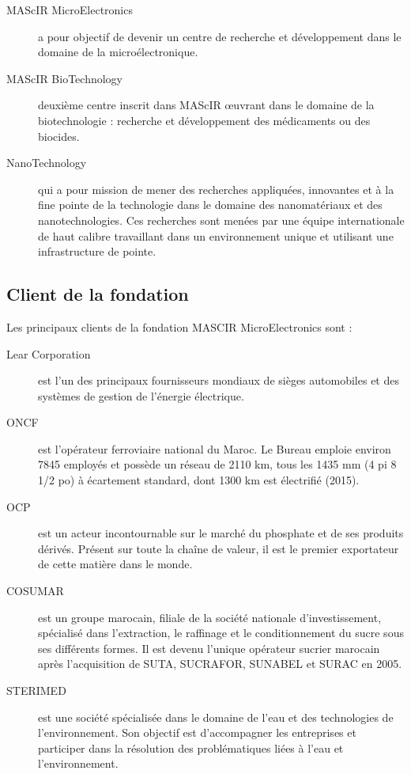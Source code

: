 \documentclass[11pt, a4paper, twoside]{book}
\begin{document}
\begin{description}
\item[MAScIR MicroElectronics] a pour objectif de devenir un centre de recherche et développement dans le domaine de la microélectronique.
\item[MAScIR BioTechnology] deuxième centre inscrit dans MAScIR œuvrant dans le domaine de la biotechnologie : recherche et développement des médicaments ou des biocides.
\item[NanoTechnology] qui a pour mission de mener des recherches appliquées, innovantes et à la fine pointe de la technologie dans le domaine des nanomatériaux et des nanotechnologies. Ces recherches sont menées par une équipe internationale de haut calibre travaillant dans un environnement unique et utilisant une infrastructure de pointe.
\end{description}

\subsection{Client de la fondation}
Les principaux clients de la fondation MASCIR MicroElectronics sont :
\begin{description}
\item[Lear Corporation] est l’un des principaux fournisseurs mondiaux de sièges automobiles et des systèmes de gestion de l’énergie électrique.
\item[ONCF] est l'opérateur ferroviaire national du Maroc. Le Bureau emploie environ 7845 employés et possède un réseau de 2110 km, tous les 1435 mm (4 pi 8 1/2 po) à écartement standard, dont 1300 km est électrifié (2015).
\item[OCP] est un acteur incontournable sur le marché du phosphate et de ses produits dérivés. Présent sur toute la chaîne de valeur, il est le premier exportateur de cette matière dans le monde.
\item[COSUMAR] est un groupe marocain, filiale de la société nationale d'investissement, spécialisé dans l'extraction, le raffinage et le conditionnement du sucre sous ses différents formes. Il est devenu l'unique opérateur sucrier marocain après l'acquisition de SUTA, SUCRAFOR, SUNABEL et SURAC en 2005.
\item[STERIMED] est une société spécialisée dans le domaine de l’eau et des technologies de l’environnement. Son objectif est d’accompagner les entreprises et participer dans la résolution des problématiques liées à l’eau et l’environnement.
\end{description}
\end{document}
